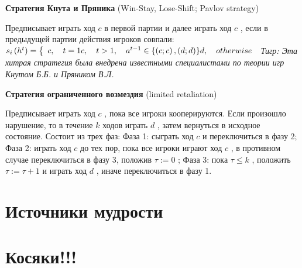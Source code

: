 \documentclass[12pt, a4paper]{article}
\theoremstyle{exersize}
\numberwithin{problem}{section}
\begin{document}
{\bf Стратегия Кнута и Пряника} (Win-Stay, Lose-Shift; Pavlov strategy)

Предписывает играть ход  $c$  в первой партии и далее играть ход  $c$ , если в предыдущей партии действия игроков совпали:  $s_{i} \left(h^{t} \right)=\left\{\begin{array}{l} {c,\quad t=1} \par {c,\quad t>1,\quad a^{t-1} \in \left\{\left(c;c\right),\left(d;d\right)\right\}} \par {d,\quad otherwise} \end{array}\right. $
{\it Тигр:  Эта хитрая стратегия была внедрена известными специалистами по теории игр Кнутом Б.Б. и Пряником В.Л.}

{\bf Стратегия ограниченного возмездия} (limited retaliation)

Предписывает играть ход  $c$ , пока все игроки кооперируются. Если произошло нарушение, то в течение  $k$  ходов играть  $d$ , затем вернуться в исходное состояние. Состоит из трех фаз:
Фаза 1: сыграть ход  $c$  и переключиться в фазу 2;
Фаза 2: играть ход  $c$  до тех пор, пока все игроки играют ход  $c$ , в противном случае переключиться в фазу 3, положив  $\tau :=0$ ;
Фаза 3: пока  $\tau \le k$ , положить  $\tau :=\tau +1$  и играть ход  $d$ , иначе переключиться в фазу 1.


\section{Источники мудрости}




\section{Косяки!!!}
\listoftodos %

\printindex %
\end{document}
